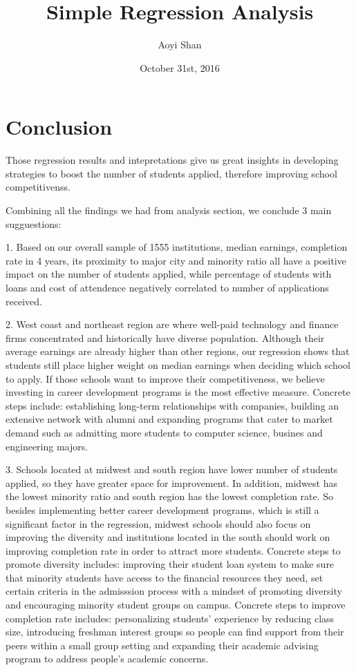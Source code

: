 \documentclass{article}
\title{Simple Regression Analysis}
\author{Aoyi Shan}
\date{October 31st, 2016}
\begin{document}


\maketitle

\section{Conclusion}

Those regression results and intepretations give us great insights in developing strategies to boost the number of students applied, therefore improving school competitivenss. 

Combining all the findings we had from analysis section, we conclude 3 main sugguestions:

1. Based on our overall sample of 1555 institutions, median earnings, completion rate in 4 years, its proximity to major city and minority ratio all have a positive impact on the number of students applied, while percentage of students with loans and cost of attendence negatively correlated to number of applications received. 

2. West coast and northeast region are where well-paid technology and finance firms concentrated and historically have diverse population. Although their average earnings are already higher than other regions, our regression shows that students still place higher weight on median earnings when deciding which school to apply. If those schools want to improve their competitiveness, we believe investing in career development programs is the most effective measure. Concrete steps include: establishing long-term relationships with companies, building an extensive network with alumni and expanding programs that cater to market demand such as admitting more students to computer science, busines and engineering majors. 

3. Schools located at midwest and south region have lower number of students applied, so they have greater space for improvement. In addition, midwest has the lowest minority ratio and south region has the lowest completion rate. So besides implementing better career development programs, which is still a significant factor in the regression, midwest schools should also focus on improving the diversity and institutions located in the south should work on improving completion rate in order to attract more students. Concrete steps to promote diversity includes: improving their student loan system to make sure that minority students have access to the financial resources they need, set certain criteria in the admisssion process with a mindset of promoting diversity and encouraging minority student groups on campus. Concrete steps to improve completion rate includes: personalizing students' experience by reducing class size, introducing freshman interest groups so people can find support from their peers within a small group setting and expanding their academic advising program to address people's academic concerns.  
\end{document}
